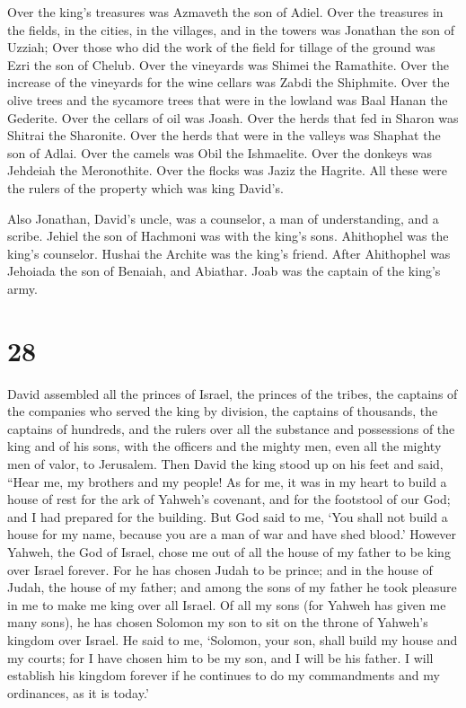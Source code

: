  Over the king's treasures was Azmaveth the son of Adiel.
Over the treasures in the fields, in the cities, in the villages, and in
the towers was Jonathan the son of Uzziah;  Over those who
did the work of the field for tillage of the ground was Ezri the son of
Chelub.  Over the vineyards was Shimei the Ramathite. Over
the increase of the vineyards for the wine cellars was Zabdi the
Shiphmite.  Over the olive trees and the sycamore trees
that were in the lowland was Baal Hanan the Gederite. Over the cellars
of oil was Joash.  Over the herds that fed in Sharon was
Shitrai the Sharonite. Over the herds that were in the valleys was
Shaphat the son of Adlai.  Over the camels was Obil the
Ishmaelite. Over the donkeys was Jehdeiah the Meronothite. Over the
flocks was Jaziz the Hagrite.  All these were the rulers of
the property which was king David's.

 Also Jonathan, David's uncle, was a counselor, a man of
understanding, and a scribe. Jehiel the son of Hachmoni was with the
king's sons.  Ahithophel was the king's counselor. Hushai
the Archite was the king's friend.  After Ahithophel was
Jehoiada the son of Benaiah, and Abiathar. Joab was the captain of the
king's army.

\hypertarget{section-27}{%
\section{28}\label{section-27}}

 David assembled all the princes of Israel, the princes of
the tribes, the captains of the companies who served the king by
division, the captains of thousands, the captains of hundreds, and the
rulers over all the substance and possessions of the king and of his
sons, with the officers and the mighty men, even all the mighty men of
valor, to Jerusalem.  Then David the king stood up on his
feet and said, ``Hear me, my brothers and my people! As for me, it was
in my heart to build a house of rest for the ark of Yahweh's covenant,
and for the footstool of our God; and I had prepared for the building.
 But God said to me, `You shall not build a house for my
name, because you are a man of war and have shed blood.' 
However Yahweh, the God of Israel, chose me out of all the house of my
father to be king over Israel forever. For he has chosen Judah to be
prince; and in the house of Judah, the house of my father; and among the
sons of my father he took pleasure in me to make me king over all
Israel.  Of all my sons (for Yahweh has given me many sons),
he has chosen Solomon my son to sit on the throne of Yahweh's kingdom
over Israel.  He said to me, `Solomon, your son, shall build
my house and my courts; for I have chosen him to be my son, and I will
be his father.  I will establish his kingdom forever if he
continues to do my commandments and my ordinances, as it is today.'

